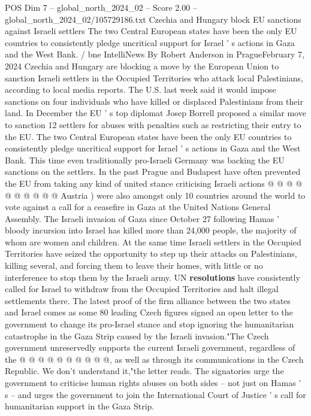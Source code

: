 \begin{textsample}{POS Dim 7 – global\_north\_2024\_02 – Score 2.00 – global\_north\_2024\_02/105729186.txt}  \label{ex:f7_pos_167}
Czechia and Hungary block EU sanctions against Israeli settlers The two Central European states have been the only EU countries to consistently pledge uncritical support for Israel ' s actions in Gaza and the West Bank. / bne IntelliNews By Robert Anderson in PragueFebruary 7, 2024 Czechia and Hungary are blocking a move by the European Union to sanction Israeli settlers in the Occupied Territories who attack local Palestinians, according to local media reports.
The U.S. last week said it would impose sanctions on four individuals who have killed or displaced Palestinians from their land.
In December the EU ' s top diplomat Josep Borrell proposed a similar move to sanction 12 settlers for abuses with penalties such as restricting their entry to the EU.
The two Central European states have been the only EU countries to consistently pledge uncritical support for Israel ' s actions in Gaza and the West Bank.
This time even traditionally pro-Israeli Germany was backing the EU sanctions on the settlers.
In the past Prague and Budapest have often prevented the EU from taking any kind of united stance criticising Israeli actions @ @ @ @ @ @ @ @ @ @ Austria ) were also amongst only 10 countries around the world to vote against a call for a ceasefire in Gaza at the United Nations General Assembly.
The Israeli invasion of Gaza since October 27 following Hamas ' bloody incursion into Israel has killed more than 24,000 people, the majority of whom are women and children.
At the same time Israeli settlers in the Occupied Territories have seized the opportunity to step up their attacks on Palestinians, killing several, and forcing them to leave their homes, with little or no interference to stop them by the Israeli army.
UN \textbf{resolutions} have consistently called for Israel to withdraw from the Occupied Territories and halt illegal settlements there.
The latest proof of the firm alliance between the two states and Israel comes as some 80 leading Czech figures signed an open letter to the government to change its pro-Israel stance and stop ignoring the humanitarian catastrophe in the Gaza Strip caused by the Israeli invasion."The Czech government unreservedly supports the current Israeli government, regardless of the @ @ @ @ @ @ @ @ @ @, as well as through its communications in the Czech Republic.
We don't understand it,"the letter reads.
The signatories urge the government to criticise human rights abuses on both sides -- not just on Hamas ' s -- and urges the government to join the International Court of Justice ' s call for humanitarian support in the Gaza Strip.

\end{textsample}
